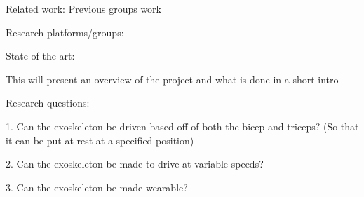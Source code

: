     Related work:
        Previous groups work

    Research platforms/groups:

    State of the art:


    This will present an overview of the project and what is done in a short intro


Research questions:

1.	Can the exoskeleton be driven based off of both the bicep and triceps? (So that it can be put at rest at a specified position)

2.	Can the exoskeleton be made to drive at variable speeds?

3.	Can the exoskeleton be made wearable?

